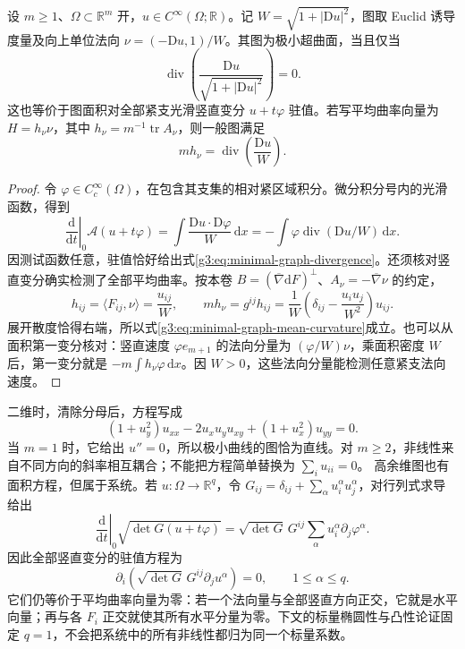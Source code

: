 \begin{theorem}\label{g3:thm:minimal-graph-equation}
	设 \(m\ge1\)、\(\Omega\subset\mathbb R^m\) 开，\(u\in C^\infty(\Omega;\mathbb R)\)。记 \(W=\sqrt{1+|\mathrm Du|^2}\)，图取 Euclid 诱导度量及向上单位法向 \(\nu=(-\mathrm Du,1)/W\)。其图为极小超曲面，当且仅当
	\begin{equation}\label{g3:eq:minimal-graph-divergence}
		\operatorname{div}\left(\frac{\mathrm Du}{\sqrt{1+|\mathrm Du|^2}}\right)=0.
	\end{equation}
	这也等价于图面积对全部紧支光滑竖直变分 \(u+t\varphi\) 驻值。若写平均曲率向量为 \(H=h_\nu\nu\)，其中 \(h_\nu=m^{-1}\operatorname{tr}A_\nu\)，则一般图满足
	\begin{equation}\label{g3:eq:minimal-graph-mean-curvature}
		mh_\nu=\operatorname{div}\left(\frac{\mathrm Du}{W}\right).
	\end{equation}
\end{theorem}
\begin{proof}
	令 \(\varphi\in C_c^\infty(\Omega)\)，在包含其支集的相对紧区域积分。微分积分号内的光滑函数，得到
	\[
		\left.\frac{\mathrm d}{\mathrm dt}\right|_0\mathcal A(u+t\varphi)
		=\int\frac{\mathrm Du\cdot\mathrm D\varphi}{W}\,\mathrm dx
		=-\int\varphi\operatorname{div}(\mathrm Du/W)\,\mathrm dx.
	\]
	因测试函数任意，驻值恰好给出式\eqref{g3:eq:minimal-graph-divergence}。还须核对竖直变分确实检测了全部平均曲率。按本卷 \(B=(\overline\nabla\mathrm dF)^\perp\)、\(A_\nu=-\overline\nabla\nu\) 的约定，
	\[
		h_{ij}=\langle F_{ij},\nu\rangle=\frac{u_{ij}}W,
		\qquad
		mh_\nu=g^{ij}h_{ij}
		=\frac1W\left(\delta_{ij}-\frac{u_i u_j}{W^2}\right)u_{ij}.
	\]
	展开散度恰得右端，所以式\eqref{g3:eq:minimal-graph-mean-curvature}成立。也可以从面积第一变分核对：竖直速度 \(\varphi e_{m+1}\) 的法向分量为 \((\varphi/W)\nu\)，乘面积密度 \(W\) 后，第一变分就是 \(-m\int h_\nu\varphi\,\mathrm dx\)。因 \(W>0\)，这些法向分量能检测任意紧支法向速度。
\end{proof}

二维时，清除分母后，方程写成
\begin{equation}\label{g3:eq:minimal-graph-two-dimensional}
	(1+u_y^2)u_{xx}-2u_xu_yu_{xy}+(1+u_x^2)u_{yy}=0.
\end{equation}
当 \(m=1\) 时，它给出 \(u''=0\)，所以极小曲线的图恰为直线。对 \(m\ge2\)，非线性来自不同方向的斜率相互耦合；不能把方程简单替换为 \(\sum_i u_{ii}=0\)。
\ProseParagraphBreak
高余维图也有面积方程，但属于系统。若 \(u:\Omega\to\mathbb R^q\)，令
\(G_{ij}=\delta_{ij}+\sum_\alpha u_i^\alpha u_j^\alpha\)，对行列式求导给出
\[
	\left.\frac{\mathrm d}{\mathrm dt}\right|_0\sqrt{\det G(u+t\varphi)}
	=\sqrt{\det G}\,G^{ij}\sum_\alpha u_i^\alpha\partial_j\varphi^\alpha.
\]
因此全部竖直变分的驻值方程为
\[
	\partial_i\left(\sqrt{\det G}\,G^{ij}\partial_j u^\alpha\right)=0,
	\qquad1\le\alpha\le q.
\]
它们仍等价于平均曲率向量为零：若一个法向量与全部竖直方向正交，它就是水平向量；再与各 \(F_i\) 正交就使其所有水平分量为零。下文的标量椭圆性与凸性论证固定 \(q=1\)，不会把系统中的所有非线性都归为同一个标量系数。

